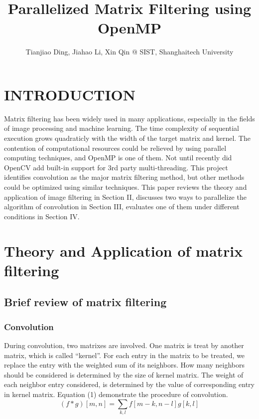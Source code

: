 \documentclass[letterpaper, 10 pt, conference]{ieeeconf}  %
\title{\LARGE \bf
Parallelized Matrix Filtering using OpenMP
}
\author{Tianjiao Ding, Jiahao Li, Xin Qin @ SIST, Shanghaitech University%
}
\begin{document}
\maketitle
\thispagestyle{empty}
\pagestyle{empty}






\section{INTRODUCTION}
Matrix filtering has been widely used in many applications, especially in the fields of image processing and machine learning. The time complexity of sequential execution grows quadraticly with the width of the target matrix and kernel. The contention of computational resources could be relieved by using parallel computing techniques, and OpenMP is one of them. Not until recently did OpenCV add built-in support for 3rd party multi-threading. This project identifies convolution as the major matrix filtering method, but other methods could be optimized using similar techniques. This paper reviews the theory and application of image filtering in Section II, discusses two ways to parallelize the algorithm of convolution in Section III, evaluates one of them under different conditions in Section IV.


\section{Theory and Application of matrix filtering}
\subsection{Brief review of matrix filtering}
\subsubsection{Convolution}
During convolution, two matrixes are involved. One matrix is treat by another matrix, which is called “kernel”. For each entry in the matrix to be treated, we replace the entry with the weighted sum of its neighbors. How many neighbors should be considered is determined by the size of kernel matrix. The weight of each neighbor entry considered, is determined by the value of corresponding entry in kernel matrix. Equation (1) demonstrate the procedure of convolution.
\begin{equation}
	(f*g)[m,n] = \sum_{k,l}f[m-k,n-l]g[k,l]
\end{equation}
\end{document}
